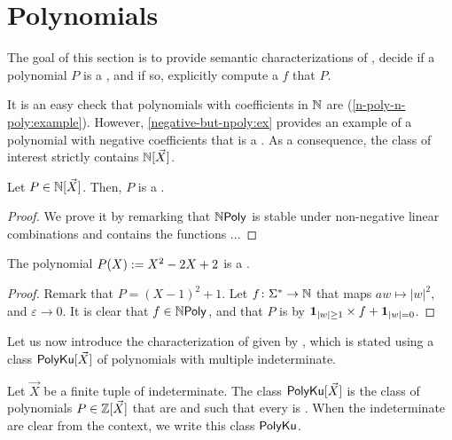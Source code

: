 \section{Polynomials}

The goal of this section is to provide semantic characterizations of
, decide if a polynomial $P$ is a
, and if so, explicitly compute a
 $f$ that  $P$.

It is an easy check that polynomials with coefficients in $\mathbb{N}$ are
 (\cref{n-poly-n-poly:example}). However,
\cref{negative-but-npoly:ex} provides an example of a polynomial with negative
coefficients that is a . As a consequence, the
class of interest strictly contains $\mathbb{N}[\vec{X}]$.


\begin{lemma}
    \label{n-poly-n-poly:example}
    Let $P \in \mathbb{N}[\vec{X}]$. Then, $P$
    is a .
\end{lemma}
\begin{proof}
    We prove it by remarking that $\NPoly$
    is stable under non-negative linear combinations
    and contains the functions ...
\end{proof}

\begin{example}
    \label{negative-but-npoly:ex}
    The polynomial $P(X) \mathrel{:=} X^2 -2X + 2$ is
    a .
\end{example}
\begin{proof}
    Remark that $P = (X-1)^2 + 1$. Let $f  \colon \Sigma^* \to \mathbb{N}$
    that maps $aw \mapsto |w|^2$, and $\varepsilon \to 0$.
    It is clear that $f \in \NPoly$, and that 
    $P$ is  by
    $\mathbf{1}_{|w| \geq 1} \times f + \mathbf{1}_{|w| = 0}$.
\end{proof}

Let us now introduce the characterization of 
given by \citeauthor{KARH77}, which is stated using a class
$\mathsf{PolyKu}[\vec{X}]$ of polynomials with multiple indeterminate.

\begin{definition}
    Let $\vec{X}$ be a finite tuple of indeterminate.
    The class $\mathsf{PolyKu}[\vec{X}]$
    is the class of polynomials $P \in \mathbb{Z}[\vec{X}]$
    that are 
    and such that every  is .
    When the indeterminate are clear from the context, we write
    this class $\mathsf{PolyKu}$.
\end{definition}

